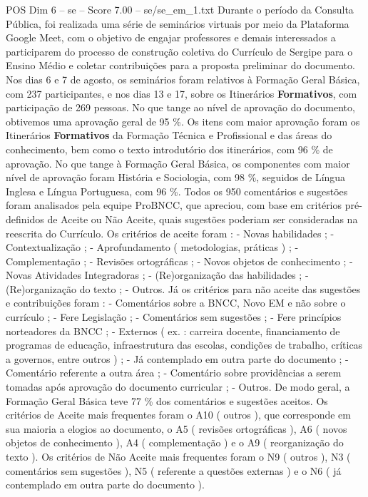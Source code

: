 \begin{textsample}{POS Dim 6 – se – Score 7.00 – se/se\_em\_1.txt}
Durante o período da Consulta Pública, foi realizada uma série de seminários virtuais por meio da Plataforma Google Meet, com o objetivo de engajar professores e demais interessados a participarem do processo de construção coletiva do Currículo de Sergipe para o Ensino Médio e coletar contribuições para a proposta preliminar do documento.
Nos dias 6 e 7 de agosto, os seminários foram relativos à Formação Geral Básica, com 237 participantes, e nos dias 13 e 17, sobre os Itinerários \textbf{Formativos}, com participação de 269 pessoas.
No que tange ao nível de aprovação do documento, obtivemos uma aprovação geral de 95 \%.
Os itens com maior aprovação foram os Itinerários \textbf{Formativos} da Formação Técnica e Profissional e das áreas do conhecimento, bem como o texto introdutório dos itinerários, com 96 \% de aprovação.
No que tange à Formação Geral Básica, os componentes com maior nível de aprovação foram História e Sociologia, com 98 \%, seguidos de Língua Inglesa e Língua Portuguesa, com 96 \%.
Todos os 950 comentários e sugestões foram analisados pela equipe ProBNCC, que apreciou, com base em critérios pré-definidos de Aceite ou Não Aceite, quais sugestões poderiam ser consideradas na reescrita do Currículo.
Os critérios de aceite foram : - Novas habilidades ; - Contextualização ; - Aprofundamento ( metodologias, práticas ) ; - Complementação ; - Revisões ortográficas ; - Novos objetos de conhecimento ; - Novas Atividades Integradoras ; - (Re)organização das habilidades ; - (Re)organização do texto ; - Outros.
Já os critérios para não aceite das sugestões e contribuições foram : - Comentários sobre a BNCC, Novo EM e não sobre o currículo ; - Fere Legislação ; - Comentários sem sugestões ; - Fere princípios norteadores da BNCC ; - Externos ( ex. : carreira docente, financiamento de programas de educação, infraestrutura das escolas, condições de trabalho, críticas a governos, entre outros ) ; - Já contemplado em outra parte do documento ; - Comentário referente a outra área ; - Comentário sobre providências a serem tomadas após aprovação do documento curricular ; - Outros.
De modo geral, a Formação Geral Básica teve 77 \% dos comentários e sugestões aceitos.
Os critérios de Aceite mais frequentes foram o A10 ( outros ), que corresponde em sua maioria a elogios ao documento, o A5 ( revisões ortográficas ), A6 ( novos objetos de conhecimento ), A4 ( complementação ) e o A9 ( reorganização do texto ).
Os critérios de Não Aceite mais frequentes foram o N9 ( outros ), N3 ( comentários sem sugestões ), N5 ( referente a questões externas ) e o N6 ( já contemplado em outra parte do documento ).

\end{textsample}
